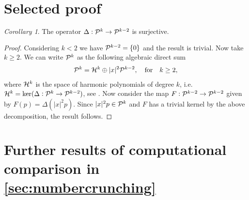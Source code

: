 \documentclass[pdflatex,sn-mathphys,Numbered]{sn-jnl}%
\theoremstyle{remark}%
\newtheorem{cor}[theorem]{Corollary}
\theoremstyle{definition}%
\begin{document}
\begin{appendices}

\section{Selected proof}
\begin{cor}\label{cor:lapsurj}
    The operator $\Delta : \mathcal{P}^k \to \mathcal{P}^{k-2}$ is surjective.
\end{cor}
\begin{proof}
    Considering $k<2$ we have $\mathcal{P}^{k-2} = \{0\}$ and the result is trivial. Now take $k\geq 2$. 
    We can write $\mathcal{P}^k$ as the following algebraic direct sum
    $$\mathcal{P}^k = \mathcal{H}^k \oplus |x|^2 \mathcal{P}^{k-2}, \quad \text{for} \quad k\geq 2,$$
    where $\mathcal{H}^k$ is the space of harmonic polynomials of degree $k$, i.e. $\mathcal{H}^k=\ker(\Delta: \mathcal{P}^k \to \mathcal{P}^{k-2})$, see \cite[Proposition 5.5]{harmonicfcttheory}.
    Now consider the map $F : \mathcal{P}^{k-2} \to \mathcal{P}^{k-2}$ given by $F(p) = \Delta(|x|^2 p)$. 
    Since $|x|^2 p\in \mathcal{P}^{k}$ and $F$ has a trivial kernel by the above decomposition, the result follows.
\end{proof}


\section{Further results of computational comparison in \cref{sec:numbercrunching}} \label{app:moretables}


\end{appendices}
\end{document}
